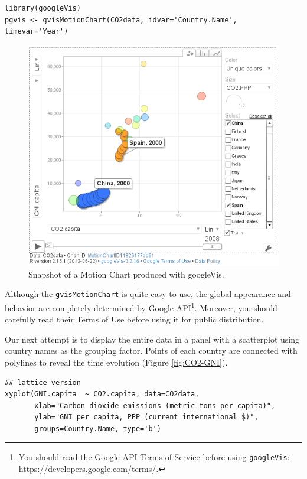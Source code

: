\documentclass[smallroyalvopaper]{memoir}
\begin{document}

\lstset{language=R,numbers=none}
\begin{lstlisting}
library(googleVis)
pgvis <- gvisMotionChart(CO2data, idvar='Country.Name', timevar='Year')
\end{lstlisting}

\begin{figure}
  \centering
  \includegraphics[width=\textwidth]{figs/googleVis}
  \caption{Snapshot of a Motion Chart produced with googleVis.}
  \label{fig:googleVis}
\end{figure}



Although the \texttt{gvisMotionChart} is quite easy to use, the global
appearance and behavior are completely determined by Google
API\footnote{You should read the Google API Terms of Service before using
  \texttt{googleVis}: \url{https://developers.google.com/terms/}.}. Moreover, you should carefully read their Terms of Use
before using it for public distribution.

Our next attempt is to display the entire data in a panel with a
scatterplot using country names as the grouping factor. Points of each
country are connected with polylines to reveal the time evolution
(Figure \ref{fig:CO2-GNI}).
\lstset{language=R,numbers=none}
\begin{lstlisting}
## lattice version
xyplot(GNI.capita  ~ CO2.capita, data=CO2data,
       xlab="Carbon dioxide emissions (metric tons per capita)",
       ylab="GNI per capita, PPP (current international $)",
       groups=Country.Name, type='b')
\end{lstlisting}
\end{document}
